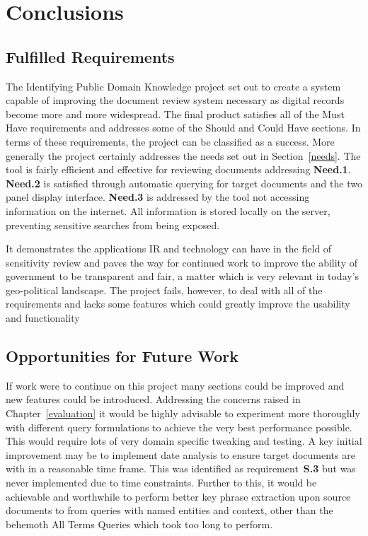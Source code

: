 \documentclass{l4proj}
\begin{document}
\chapter{Conclusions} \label{conclusion}
\section{Fulfilled Requirements}
The Identifying Public Domain Knowledge project set out to create a system capable of improving the document review system necessary as digital records become more and more widespread.
The final product satisfies all of the Must Have requirements and addresses some of the Should and Could Have sections. In terms of these requirements, the project can be classified as a success. More generally the project certainly addresses the needs set out in Section~\ref{needs}. The tool is fairly efficient and effective for reviewing documents addressing \textbf{Need.1}. \textbf{Need.2} is satisfied through automatic querying for target documents and the two panel display interface. \textbf{Need.3} is addressed by the tool not accessing information on the internet. All information is stored locally on the server, preventing sensitive searches from being exposed.

It demonstrates the applications IR and technology can have in the field of sensitivity review and paves the way for continued work to improve the ability of government to be transparent and fair, a matter which is very relevant in today's geo-political landscape. The project fails, however, to deal with all of the requirements and lacks some features which could greatly improve the usability and functionality

\section{Opportunities for Future Work}
If work were to continue on this project many sections could be improved and new features could be introduced. Addressing the concerns raised in Chapter~\ref{evaluation} it would be highly advisable to experiment more thoroughly with different query formulations to achieve the very best performance possible. This would require lots of very domain specific tweaking and testing. A key initial improvement may be to implement date analysis to ensure target documents are with in a reasonable time frame. This was identified as requirement~\textbf{S.3} but was never implemented due to time constraints.
Further to this, it would be achievable and worthwhile to perform better key phrase extraction upon source documents to from queries with named entities and context, other than the behemoth All Terms Queries which took too long to perform.
\end{document}
